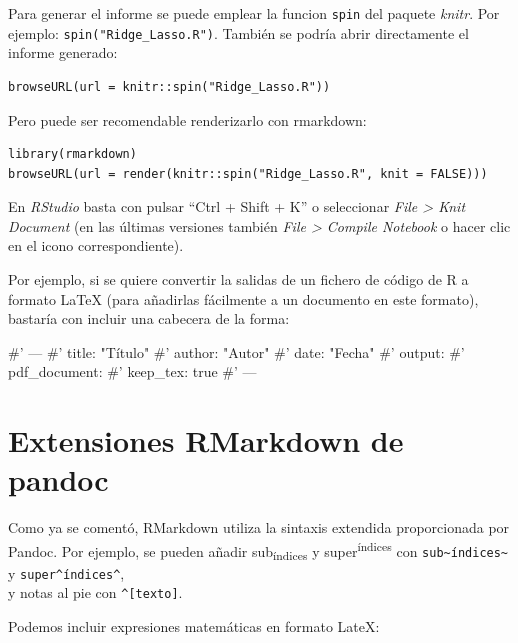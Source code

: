 \documentclass[]{book}
\newenvironment{Shaded}{\begin{snugshade}}{\end{snugshade}}
\newcommand{\NormalTok}[1]{#1}
\theoremstyle{definition}
\theoremstyle{definition}
\theoremstyle{definition}
\theoremstyle{remark}
\begin{document}
Para generar el informe se puede emplear la funcion \texttt{spin} del
paquete \emph{knitr}. Por ejemplo: \texttt{spin("Ridge\_Lasso.R")}.
También se podría abrir directamente el informe generado:

\begin{verbatim}
browseURL(url = knitr::spin("Ridge_Lasso.R"))
\end{verbatim}

Pero puede ser recomendable renderizarlo con rmarkdown:

\begin{verbatim}
library(rmarkdown)
browseURL(url = render(knitr::spin("Ridge_Lasso.R", knit = FALSE)))
\end{verbatim}

En \emph{RStudio} basta con pulsar ``Ctrl + Shift + K'' o seleccionar
\emph{File \textgreater{} Knit Document} (en las últimas versiones
también \emph{File \textgreater{} Compile Notebook} o hacer clic en el
icono correspondiente).

Por ejemplo, si se quiere convertir la salidas de un fichero de código
de R a formato LaTeX (para añadirlas fácilmente a un documento en este
formato), bastaría con incluir una cabecera de la forma:

\begin{Shaded}
\begin{Highlighting}[]
\NormalTok{#' ---}
\NormalTok{#' title: "Título"}
\NormalTok{#' author: "Autor"}
\NormalTok{#' date: "Fecha"}
\NormalTok{#' output:}
\NormalTok{#'   pdf_document:}
\NormalTok{#'      keep_tex: true}
\NormalTok{#' ---}
\end{Highlighting}
\end{Shaded}

\section{Extensiones RMarkdown de
pandoc}\label{extensiones-rmarkdown-de-pandoc}

Como ya se comentó, RMarkdown utiliza la sintaxis extendida
proporcionada por Pandoc. Por ejemplo, se pueden añadir
sub\textsubscript{índices} y super\textsuperscript{índices} con
\texttt{sub\textasciitilde{}índices\textasciitilde{}} y
\texttt{super\^{}índices\^{}},\\
y notas al pie con \texttt{\^{}{[}texto{]}}.

Podemos incluir expresiones matemáticas en formato LateX:
\end{document}
